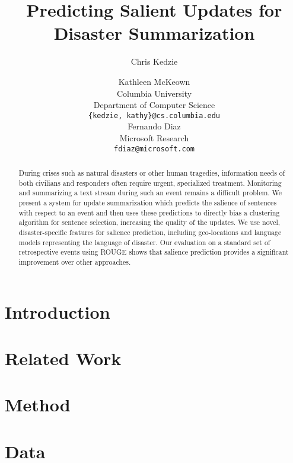 \documentclass[11pt]{article}
\title{Predicting Salient Updates for Disaster Summarization}
\author{Chris Kedzie \and Kathleen McKeown\\
Columbia University\\
Department of Computer Science\\
{\tt \{kedzie, kathy\}@cs.columbia.edu} \\\And
 Fernando Diaz\\
 Microsoft Research\\
  {\tt fdiaz@microsoft.com} \\ 
  }
\date{}
\begin{document}
\maketitle
\begin{abstract}
During crises such as natural disasters or other human tragedies, information
needs of both civilians and responders often require urgent, specialized
treatment.  
Monitoring and summarizing a text stream
during such an event remains a difficult problem. 
We present a system for update summarization which predicts the salience of 
sentences with respect to an event and then uses these
predictions to directly bias a clustering algorithm for sentence selection,
increasing the quality of the updates. We use novel, disaster-specific features
for salience prediction, including geo-locations and language models
representing the language of disaster.
Our evaluation on a standard set of retrospective events using ROUGE shows 
that salience prediction provides a significant improvement over 
other approaches.



\end{abstract}

\section{Introduction}



\section{Related Work}


\section{Method}


\section{Data}
\label{sec:data}

\end{document}
